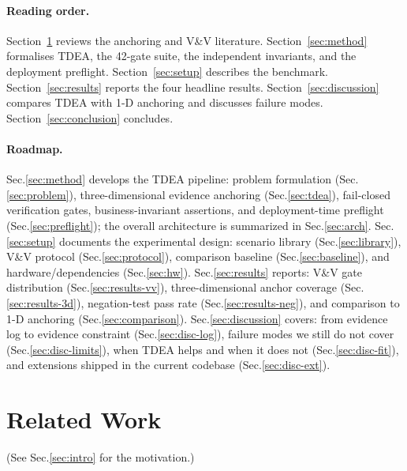 \documentclass[review,3p]{elsarticle}
\begin{document}
\paragraph{Reading order.}
Section~\ref{sec:related} reviews the anchoring and V\&V literature. Section~\ref{sec:method} formalises TDEA, the 42-gate suite, the independent invariants, and the deployment preflight. Section~\ref{sec:setup} describes the benchmark. Section~\ref{sec:results} reports the four headline results. Section~\ref{sec:discussion} compares TDEA with 1-D anchoring and discusses failure modes. Section~\ref{sec:conclusion} concludes.



\paragraph{Roadmap.} Sec.\ref{sec:method} develops the TDEA pipeline: problem formulation (Sec.\ref{sec:problem}), three-dimensional evidence anchoring (Sec.\ref{sec:tdea}), fail-closed verification gates, business-invariant assertions, and deployment-time preflight (Sec.\ref{sec:preflight}); the overall architecture is summarized in Sec.\ref{sec:arch}.
Sec.\ref{sec:setup} documents the experimental design: scenario library (Sec.\ref{sec:library}), V\&V protocol (Sec.\ref{sec:protocol}), comparison baseline (Sec.\ref{sec:baseline}), and hardware/dependencies (Sec.\ref{sec:hw}).
Sec.\ref{sec:results} reports: V\&V gate distribution (Sec.\ref{sec:results-vv}), three-dimensional anchor coverage (Sec.\ref{sec:results-3d}), negation-test pass rate (Sec.\ref{sec:results-neg}), and comparison to 1-D anchoring (Sec.\ref{sec:comparison}).
Sec.\ref{sec:discussion} covers: from evidence log to evidence constraint (Sec.\ref{sec:disc-log}), failure modes we still do not cover (Sec.\ref{sec:disc-limits}), when TDEA helps and when it does not (Sec.\ref{sec:disc-fit}), and extensions shipped in the current codebase (Sec.\ref{sec:disc-ext}).

\section{Related Work}
\label{sec:related}
(See Sec.\ref{sec:intro} for the motivation.)
\end{document}
